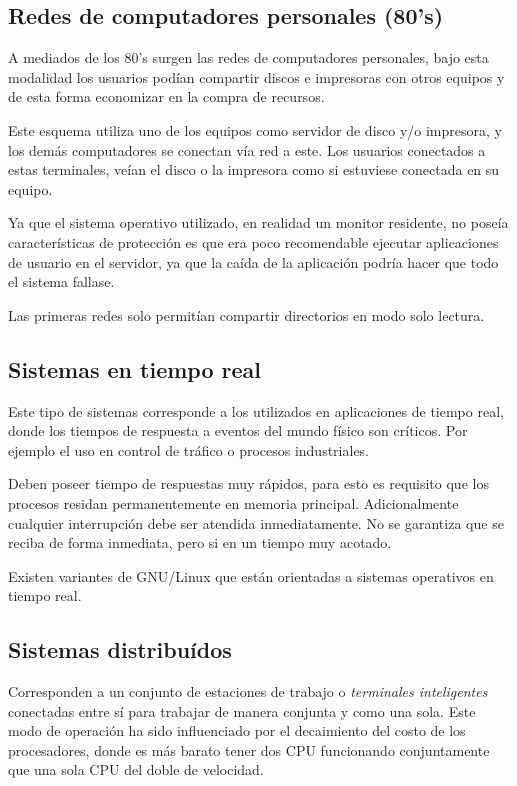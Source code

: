 \subsection{Redes de computadores personales (80's)}
A mediados de los 80's surgen las redes de computadores personales, bajo esta
modalidad los usuarios podían compartir discos e impresoras con otros equipos y
de esta forma economizar en la compra de recursos.

Este esquema utiliza uno de los equipos como servidor de disco y/o impresora, y
los demás computadores se conectan vía red a este. Los usuarios conectados a
estas terminales, veían el disco o la impresora como si estuviese conectada en
su equipo.

Ya que el sistema operativo utilizado, en realidad un monitor residente, no
poseía características de protección es que era poco recomendable ejecutar
aplicaciones de usuario en el servidor, ya que la caída de la aplicación podría
hacer que todo el sistema fallase.

Las primeras redes solo permitían compartir directorios en modo solo lectura.

\subsection{Sistemas en tiempo real}
Este tipo de sistemas corresponde a los utilizados en aplicaciones de tiempo
real, donde los tiempos de respuesta a eventos del mundo físico son críticos.
Por ejemplo el uso en control de tráfico o procesos industriales.

Deben poseer tiempo de respuestas muy rápidos, para esto es requisito que los
procesos residan permanentemente en memoria principal. Adicionalmente cualquier
interrupción debe ser atendida inmediatamente. No se garantiza que se reciba de
forma inmediata, pero si en un tiempo muy acotado.

Existen variantes de GNU/Linux que están orientadas a sistemas operativos en
tiempo real.

\subsection{Sistemas distribuídos}
Corresponden a un conjunto de estaciones de trabajo o \textit{terminales
inteligentes} conectadas entre sí para trabajar de manera conjunta y como una
sola. Este modo de operación ha sido influenciado por el decaimiento del costo
de los procesadores, donde es más barato tener dos CPU funcionando conjuntamente
que una sola CPU del doble de velocidad.

